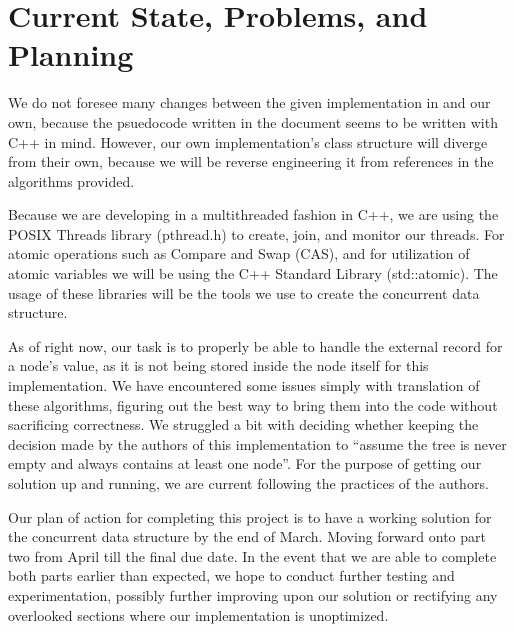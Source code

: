 \documentclass[12pt,a4paper]{article}
\begin{document}
\section{Current State, Problems, and Planning}
We do not foresee many changes between the given implementation in \cite{RedBlackDoc} and our own, because the psuedocode written in the document seems to be written with C++ in mind. However, our own implementation's class structure will diverge from their own, because we will be reverse engineering it from references in the algorithms provided.
\par Because we are developing in a multithreaded fashion in C++, we are using the POSIX Threads library (pthread.h) to create, join, and monitor our threads. For atomic operations such as Compare and Swap (CAS), and for utilization of atomic variables we will be using the C++ Standard Library (std::atomic). The usage of these libraries will be the tools we use to create the concurrent data structure.
\par As of right now, our task is to properly be able to handle the external record for a node's value, as it is not being stored inside the node itself for this implementation. We have encountered some issues simply with translation of these algorithms, figuring out the best way to bring them into the code without sacrificing correctness. We struggled a bit with deciding whether keeping the decision made by the authors of this implementation to ``assume the tree is never empty and always contains at least one node''\cite{RedBlackDoc}. For the purpose of getting our solution up and running, we are current following the practices of the authors.
\par Our plan of action for completing this project is to have a working solution for the concurrent data structure by the end of March. Moving forward onto part two from April till the final due date. In the event that we are able to complete both parts earlier than expected, we hope to conduct further testing and experimentation, possibly further improving upon our solution or rectifying any overlooked sections where our implementation is unoptimized.
\newpage
{}


\end{document}

